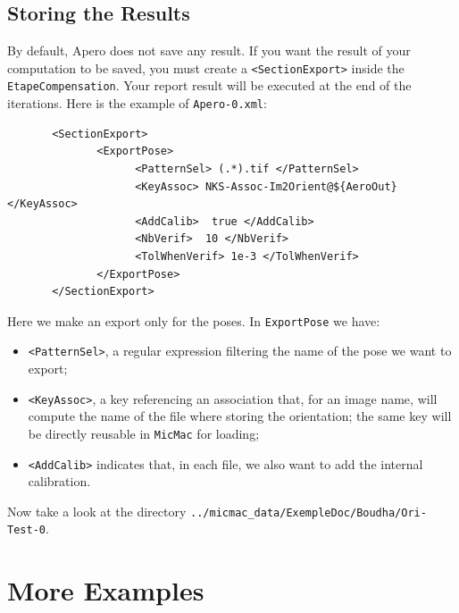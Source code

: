 \subsection{Storing the Results}

\label{Result:Apero0}

By default, Apero does not save any result. If you want the result
of your computation to be saved, you must create a {\tt <SectionExport>}
inside the {\tt EtapeCompensation}. Your report result will be executed at the end
of the iterations. Here is the example of {\tt Apero-0.xml}:

{\scriptsize
\begin{verbatim}
       <SectionExport>
              <ExportPose>
                    <PatternSel> (.*).tif </PatternSel>
                    <KeyAssoc> NKS-Assoc-Im2Orient@${AeroOut} </KeyAssoc>
                    <AddCalib>  true </AddCalib>
                    <NbVerif>  10 </NbVerif>
                    <TolWhenVerif> 1e-3 </TolWhenVerif>
              </ExportPose>
       </SectionExport>

\end{verbatim}
}

Here we make an export only for the poses. In {\tt ExportPose} we have:

\begin{itemize}
    \item {\tt <PatternSel>}, a regular expression filtering the name of the pose
          we want to export;

    \item {\tt <KeyAssoc>}, a key referencing an association that, for an image name,
            will compute the name of the file where storing the orientation;
            the same key will be directly reusable in {\tt MicMac} for loading;

    \item {\tt <AddCalib>} indicates that, in each file, we also want to add
          the internal calibration.
\end{itemize}

Now take a look at the directory {\tt ../micmac\_data/ExempleDoc/Boudha/Ori-Test-0}.


\section{More Examples}

